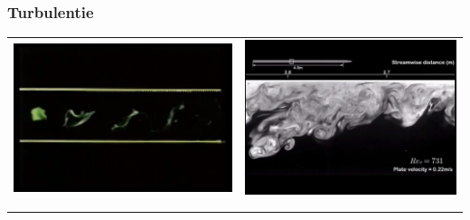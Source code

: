 \documentclass[t]{beamer}
\begin{document}
  	\begin{frame}
		\frametitle{Turbulentie}
		\center
		\begin{tabular}{cc}
			\href{run:fig/uitwendige_stroming/Turbulent_mixing.mp4}{
				\includegraphics[height=0.3\textheight]{../fig/uitwendige_stroming/Turbulent_mixing.png}
			}
			&
			\href{run:fig/uitwendige_stroming/Turbulent_boundary_layer_eddies.mp4}{
				\includegraphics[height=0.3\textheight]{../fig/uitwendige_stroming/Turbulent_boundary_layer_eddies.png}
			}
			\\
			&
			\\
			\href{run:fig/uitwendige_stroming/Turbulent_velocity_profile.mp4}{
}
\end{tabular}
\end{frame}
\end{document}
